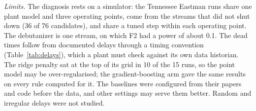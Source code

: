 \emph{Limits.} The diagnosis rests on a simulator: the Tennessee Eastman runs share one plant model
and three operating points, come from the streams that did not shut down (36 of 76 candidates),
and share a tuned step within each operating point. The debutanizer is one stream, on which F2 had a
power of about 0.1. The dead times follow from documented delays through a timing convention
(Table~\ref{tab:delays}), which a plant must check against its own data historian. The ridge
penalty sat at the top of its grid in 10 of the 15 runs, so the point model may be
over-regularised; the gradient-boosting arm gave the same results on every rule computed for it.
The baselines were configured from their papers and code before the data, and other settings may
serve them better. Random and irregular
delays \citep{shardt2016,guo2014} were not studied.


